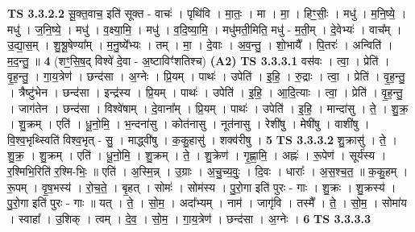 \documentclass[17pt]{extarticle}
\begin{document}
                  \newline
                                \textbf{ TS 3.3.2.2} \newline
                  सू॒क्त॒वाच॒ इति॑ सूक्त - वाचः॑ । पृथि॑वि । मा॒तः॒ । मा । मा॒ । हिꣳ॒॒सीः॒ । मधु॑ । म॒नि॒ष्ये॒ । मधु॑ । ज॒नि॒ष्ये॒ । मधु॑ । व॒क्ष्या॒मि॒ । मधु॑ । व॒दि॒ष्या॒मि॒ । मधु॑मती॒मिति॒ मधु॑ - म॒ती॒म् । दे॒वेभ्यः॑ । वाच᳚म् । उ॒द्या॒स॒म् । शु॒श्रू॒षेण्या᳚म् । म॒नु॒ष्ये᳚भ्यः । तम् । मा॒ । दे॒वाः । अ॒व॒न्तु॒ । शो॒भायै᳚ । पि॒तरः॑ । अन्विति॑ । म॒द॒न्तु॒ ॥ \textbf{  4} \newline
                  \newline
                      (शꣳ॒॒सि॒ष॒द् विश्वे॑ दे॒वा - अ॒ष्टाविꣳ॑शतिश्च)  \textbf{(A2)} \newline \newline
                                \textbf{ TS 3.3.3.1} \newline
                  वस॑वः । त्वा॒ । प्रेति॑ । वृ॒ह॒न्तु॒ । गा॒य॒त्रेण॑ । छन्द॑सा । अ॒ग्नेः । प्रि॒यम् । पाथः॑ । उपेति॑ । इ॒हि॒ । रु॒द्राः । त्वा॒ । प्रेति॑ । वृ॒ह॒न्तु॒ । त्रैष्टु॑भेन । छन्द॑सा । इन्द्र॑स्य । प्रि॒यम् । पाथः॑ । उपेति॑ । इ॒हि॒ । आ॒दि॒त्याः । त्वा॒ । प्रेति॑ । वृ॒ह॒न्तु॒ । जाग॑तेन । छन्द॑सा । विश्वे॑षाम् । दे॒वाना᳚म् । प्रि॒यम् । पाथः॑ । उपेति॑ । इ॒हि॒ । मान्दा॑सु । ते॒ । शु॒क्र॒ । शु॒क्रम् । एति॑ । धू॒नो॒मि॒ । भ॒न्दना॑सु । कोत॑नासु । नूत॑नासु । रेशी॑षु । मेषी॑षु । वाशी॑षु । वि॒श्व॒भृथ्स्विति॑ विश्व॒भृत् - सु॒ । माद्ध्वी॑षु । क॒कु॒हासु॑ । शक्व॑रीषु । \textbf{  5} \newline
                  \newline
                                \textbf{ TS 3.3.3.2} \newline
                  शु॒क्रासु॑ । ते॒ । शु॒क्र॒ । शु॒क्रम् । एति॑ । धू॒नो॒मि॒ । शु॒क्रम् । ते॒ । शु॒क्रेण॑ । गृ॒ह्णा॒मि॒ । अह्नः॑ । रू॒पेण॑ । सूर्य॑स्य । र॒श्मिभि॒रिति॑ र॒श्मि-भिः॒ ॥ एति॑ । अ॒स्मि॒न्न् । उ॒ग्राः । अ॒चु॒च्य॒वुः॒ । दि॒वः । धाराः᳚ । अ॒स॒श्च॒त॒ ॥ क॒कु॒हम् । रू॒पम् । वृ॒ष॒भस्य॑ । रो॒च॒ते॒ । बृ॒हत् । सोमः॑ । सोम॑स्य । पु॒रो॒गा इति॑ पुरः - गाः । शु॒क्रः । शु॒क्रस्य॑ । पु॒रो॒गा इति॑ पुरः - गाः ॥ यत् । ते॒ । सो॒म॒ । अदा᳚भ्यम् । नाम॑ । जागृ॑वि । तस्मै᳚ । ते॒ । सो॒म॒ । सोमा॑य । स्वाहा᳚ । उ॒शिक् । त्वम् । दे॒व॒ । सो॒म॒ । गा॒य॒त्रेण॑ । छन्द॑सा । अ॒ग्नेः । \textbf{  6} \newline
                  \newline
                                \textbf{ TS 3.3.3.3} \newline
\end{document}

